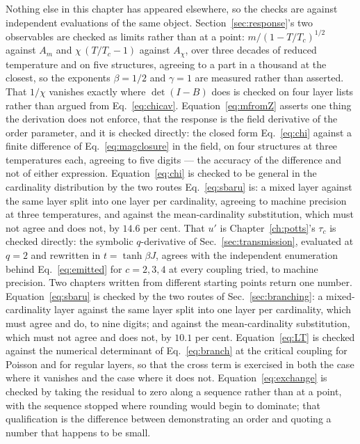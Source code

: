 Nothing else in this chapter has appeared elsewhere, so the checks are against
independent evaluations of the same object.
Section~\ref{sec:response}'s two observables are checked as limits rather than
at a point: $m/(1-T/T_{c})^{1/2}$ against $A_{m}$ and $\chi\,(T/T_{c}-1)$
against $A_{\chi}$, over three decades of reduced temperature and on five
structures, agreeing to a part in a thousand at the closest, so the exponents
$\beta=1/2$ and $\gamma=1$ are measured rather than asserted. That $1/\chi$
vanishes exactly where $\det(I-B)$ does is checked on four layer lists rather
than argued from Eq.~\eqref{eq:chicav}. Equation~\eqref{eq:mfromZ} asserts one
thing the derivation does not enforce, that the response is the field
derivative of the order parameter, and it is checked directly: the closed form
Eq.~\eqref{eq:chi} against a finite difference of Eq.~\eqref{eq:magclosure} in
the field, on four structures at three temperatures each, agreeing to five
digits --- the accuracy of the difference and not of either expression.
Equation~\eqref{eq:chi} is checked to be general in the cardinality
distribution by the two routes Eq.~\eqref{eq:sbaru} is: a mixed layer against
the same layer split into one layer per cardinality, agreeing to machine
precision at three temperatures, and against the mean-cardinality substitution,
which must not agree and does not, by $14.6$ per cent. That $u'$ is
Chapter~\ref{ch:potts}'s $\tau_{c}$ is checked directly: the symbolic
$q$-derivative of Sec.~\ref{sec:transmission}, evaluated at $q=2$ and rewritten
in $t=\tanh\beta J$, agrees with the independent enumeration behind
Eq.~\eqref{eq:emitted} for $c=2,3,4$ at every coupling tried, to machine
precision. Two chapters written from different starting points return one
number. Equation~\eqref{eq:sbaru} is checked by the two routes of
Sec.~\ref{sec:branching}: a mixed-cardinality layer against the same layer split into one
layer per cardinality, which must agree and do, to nine digits; and against the
mean-cardinality substitution, which must not agree and does not, by $10.1$ per cent.
Equation~\eqref{eq:LT} is checked against the numerical determinant of
Eq.~\eqref{eq:branch} at the critical coupling for Poisson and for regular
layers, so that the cross term is exercised in both the case where it vanishes
and the case where it does not. Equation~\eqref{eq:exchange} is checked by
taking the residual to zero along a sequence rather than at a point, with the
sequence stopped where rounding would begin to dominate; that qualification is
the difference between demonstrating an order and quoting a number that happens
to be small.

